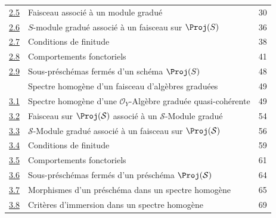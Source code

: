 \begin{longtable}{@{}p{}p{}r@{}}
\hyperref[subsection:II.2.5-fr]{2.5} & Faisceau associé à un module gradué & 30\\
\hyperref[subsection:II.2.6-fr]{2.6} & $S$-module gradué associé à un faisceau sur $\Proj(S)$ & 36\\
\hyperref[subsection:II.2.7-fr]{2.7} & Conditions de finitude & 38\\
\hyperref[subsection:II.2.8-fr]{2.8} & Comportements fonctoriels & 41\\
\hyperref[subsection:II.2.9-fr]{2.9} & Sous-préschémas fermés d'un schéma $\Proj(S)$ & 48\\
\hyperref[section:II.3-fr]{\textsection3} & Spectre homogène d'un faisceau d'algèbres graduées & 49\\
\hyperref[subsection:II.3.1-fr]{3.1} & Spectre homogène d'une $\mathcal{O}_Y$-Algèbre graduée quasi-cohérente & 49\\
\hyperref[subsection:II.3.2-fr]{3.2} & Faisceau sur $\Proj(\mathcal{S})$ associé à un $\mathcal{S}$-Module gradué & 54\\
\hyperref[subsection:II.3.3-fr]{3.3} & $\mathcal{S}$-Module gradué associé à un faisceau sur $\Proj(\mathcal{S})$ & 56\\
\hyperref[subsection:II.3.4-fr]{3.4} & Conditions de finitude & 59\\
\hyperref[subsection:II.3.5-fr]{3.5} & Comportements fonctoriels & 61\\
\hyperref[subsection:II.3.6-fr]{3.6} & Sous-préschémas fermés d'un préschéma $\Proj(\mathcal{S})$ & 64\\
\hyperref[subsection:II.3.7-fr]{3.7} & Morphismes d'un préschéma dans un spectre homogène & 65\\
\hyperref[subsection:II.3.8-fr]{3.8} & Critères d'immersion dans un spectre homogène & 69\\
\end{longtable}
